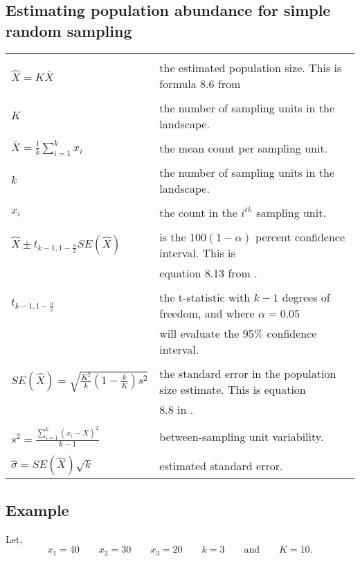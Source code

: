 \documentclass[11pt, oneside]{article}   	%
\begin{document}
\begin{table}[htp]
\subsection*{Estimating population abundance for simple random sampling}
\begin{center}
\begin{tabular}{|ll|}
\hline
& \\
$\hat{X}=K\bar{X}$ & the estimated population size. This is formula 8.6 from \cite{Ska} \\
& \\
$K$ & the number of sampling units in the landscape. \\
& \\
$\bar{X} = \frac{1}{k} \sum_{i=1}^k x_i$ & the mean count per sampling unit. \\
& \\
$k$ & the number of sampling units in the landscape. \\
& \\
$x_i$ & the count in the $i^{th}$ sampling unit. \\
& \\
$\hat{X} \pm t_{k-1, 1-\frac{\alpha}{2}} SE(\hat{X})$ & is the $100(1-\alpha)$ percent confidence interval. This is \\
 &  equation 8.13 from \cite{Ska}.\\
 & \\
 $t_{k-1, 1-\frac{\alpha}{2}}$ & the t-statistic with $k-1$ degrees of freedom, and where $\alpha=0.05$\\
 & will evaluate the 95$\%$ confidence interval.\\
 & \\
 $SE(\hat{X}) = \sqrt{\frac{K^2}{k}\left(1-\frac{k}{K}\right)s^2}$ & the standard error in the population size estimate. This is equation \\
 &  8.8 in \cite{Ska}.\\
 & \\
 $s^2 = \frac{\sum_{i=1}^k (x_i -\bar{X})^2}{k-1}$ & between-sampling unit variability. \\
 & \\
 $\hat{\sigma} = SE(\hat{X})\sqrt{k}$ & estimated standard error.\\ \hline
\end{tabular}
\end{center}
\label{default}
\end{table}

\subsection*{Example}
Let,
\[x_1 = 40 \qquad x_2 = 30 \qquad x_3 = 20 \qquad k=3 \qquad \mbox{and}\qquad K=10.\]
\end{document}

